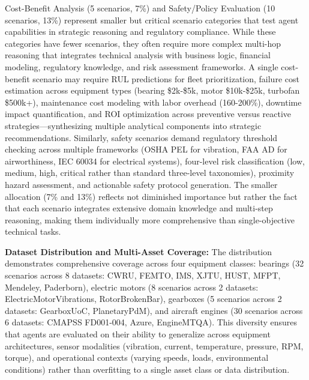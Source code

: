 \documentclass[sigconf,review]{acmart}
\begin{document}
Cost-Benefit Analysis (5 scenarios, 7\%) and Safety/Policy Evaluation (10 scenarios, 13\%) represent smaller but critical scenario categories that test agent capabilities in strategic reasoning and regulatory compliance. While these categories have fewer scenarios, they often require more complex multi-hop reasoning that integrates technical analysis with business logic, financial modeling, regulatory knowledge, and risk assessment frameworks. A single cost-benefit scenario may require RUL predictions for fleet prioritization, failure cost estimation across equipment types (bearing \$2k-\$5k, motor \$10k-\$25k, turbofan \$500k+), maintenance cost modeling with labor overhead (160-200\%), downtime impact quantification, and ROI optimization across preventive versus reactive strategies---synthesizing multiple analytical components into strategic recommendations. Similarly, safety scenarios demand regulatory threshold checking across multiple frameworks (OSHA PEL for vibration, FAA AD for airworthiness, IEC 60034 for electrical systems), four-level risk classification (low, medium, high, critical rather than standard three-level taxonomies), proximity hazard assessment, and actionable safety protocol generation. The smaller allocation (7\% and 13\%) reflects not diminished importance but rather the fact that each scenario integrates extensive domain knowledge and multi-step reasoning, making them individually more comprehensive than single-objective technical tasks.

\textbf{Dataset Distribution and Multi-Asset Coverage:} The distribution demonstrates comprehensive coverage across four equipment classes: bearings (32 scenarios across 8 datasets: CWRU, FEMTO, IMS, XJTU, HUST, MFPT, Mendeley, Paderborn), electric motors (8 scenarios across 2 datasets: ElectricMotorVibrations, RotorBrokenBar), gearboxes (5 scenarios across 2 datasets: GearboxUoC, PlanetaryPdM), and aircraft engines (30 scenarios across 6 datasets: CMAPSS FD001-004, Azure, EngineMTQA). This diversity ensures that agents are evaluated on their ability to generalize across equipment architectures, sensor modalities (vibration, current, temperature, pressure, RPM, torque), and operational contexts (varying speeds, loads, environmental conditions) rather than overfitting to a single asset class or data distribution.
\end{document}
